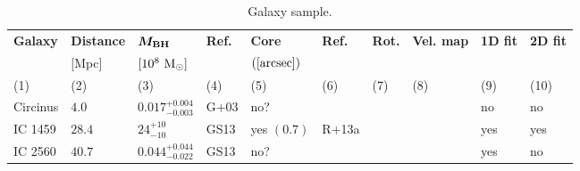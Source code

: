 \begin{table*}                                        
\begin{center}                                        
\caption{Galaxy sample.}                                 
\begin{tabular}{llllllllll}                           
\hline                                                
\multicolumn{1}{l}{{\bf Galaxy}} &                   
\multicolumn{1}{l}{{\bf Distance}} &                 
\multicolumn{1}{l}{{\bf $\bm{M_{\rm BH}}$}} &  
\multicolumn{1}{l}{{\bf Ref.}} &                     
\multicolumn{1}{l}{{\bf Core}} &                     
\multicolumn{1}{l}{{\bf Ref.}} &                     
\multicolumn{1}{l}{{\bf Rot.}} &                     
\multicolumn{1}{l}{{\bf Vel. map}} &                 
\multicolumn{1}{l}{{\bf 1D fit}} &                   
\multicolumn{1}{l}{{\bf 2D fit}} \\                
\multicolumn{1}{l}{} &                                
\multicolumn{1}{l}{[Mpc]} &                           
\multicolumn{1}{l}{$[10^8~\rm M_{\odot}]$} &         
\multicolumn{1}{l}{} &                                
\multicolumn{1}{l}{$([\rm arcsec])$} &                                
\multicolumn{1}{l}{} &                                
\multicolumn{1}{l}{} &                                
\multicolumn{1}{l}{} &                                
\multicolumn{1}{l}{} &                                
\multicolumn{1}{l}{} \\                             
\multicolumn{1}{l}{(1)} &                             
\multicolumn{1}{l}{(2)} &                             
\multicolumn{1}{l}{(3)} &                             
\multicolumn{1}{l}{(4)} &                             
\multicolumn{1}{l}{(5)} &                             
\multicolumn{1}{l}{(6)} &                             
\multicolumn{1}{l}{(7)} &                             
\multicolumn{1}{l}{(8)} &                             
\multicolumn{1}{l}{(9)} &                             
\multicolumn{1}{l}{(10)} \\                         
\hline                                                
Circinus   &  $4.0$  &  $0.017_{-0.003}^{+0.004}$   &  G+03  &  no?  &     &      &     &  no  &  no  \\ 
IC 1459  &  $28.4$  &  $24_{-10}^{+10}$   &  GS13  &  yes  $(0.7)$  &  R+13a  &      &     &  yes  &  yes  \\ 
IC 2560  &  $40.7$  &  $0.044_{-0.022}^{+0.044}$   &  GS13  &  no?  &     &      &     &  yes  &  no  \\ 

\end{tabular}
\end{center}
\end{table*}
